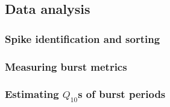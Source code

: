 \documentclass[9pt,lineno]{elife}
\begin{document}
\subsection*{Data analysis}

\subsubsection*{Spike identification and sorting}

\subsubsection*{Measuring burst metrics}

\subsubsection*{Estimating $Q_{10}$s of burst periods}




\appendix
\end{document}
